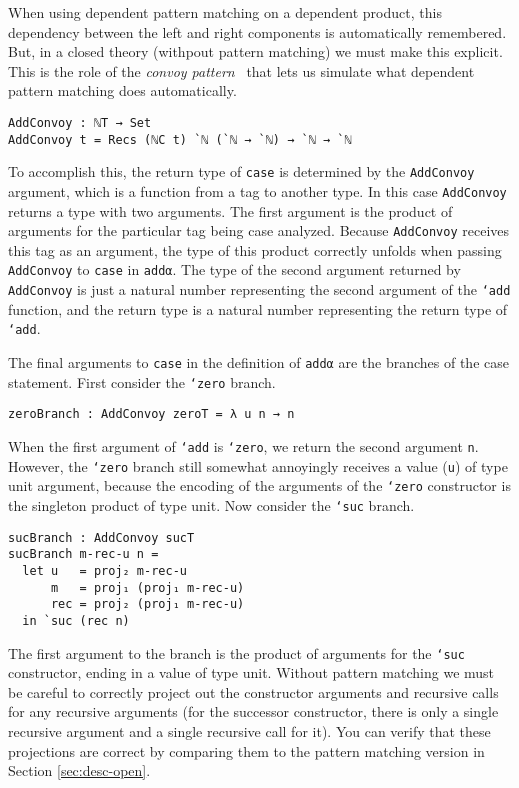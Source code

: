 \documentclass[runningheads,a4paper]{llncs}
\newcommand{\refsec}[1]{Section \ref{sec:#1}}
\begin{document}
When using dependent pattern
matching on a dependent product, this dependency between the left and
right components is automatically remembered. But, in a closed theory
(withpout pattern matching) we must make this explicit.  This is
the role of the {\it convoy pattern}~\cite{chlipala2011certified}
that lets us simulate what dependent pattern matching does automatically.



\begin{verbatim}
AddConvoy : ℕT → Set
AddConvoy t = Recs (ℕC t) `ℕ (`ℕ → `ℕ) → `ℕ → `ℕ
\end{verbatim}

To accomplish this, the return type of {\tt case} is determined by the
{\tt AddConvoy} argument, which is a function from a tag to another
type. In this case {\tt AddConvoy} returns a type with two arguments.
The first argument is the product of arguments for the particular tag
being case analyzed. Because {\tt AddConvoy} receives this tag as an
argument, the type of this product correctly unfolds when passing
{\tt AddConvoy} to {\tt case} in {\tt addα}. The type of the second
argument returned by {\tt AddConvoy} is just a natural number
representing the second argument of the {\tt `add} function, and the
return type is a natural number representing the return type of
{\tt `add}.

The final arguments to {\tt case} in the definition of
{\tt addα} are the branches of the case statement.
First consider the {\tt `zero} branch.

\begin{verbatim}
zeroBranch : AddConvoy zeroT = λ u n → n
\end{verbatim}

When the first argument of {\tt `add} is {\tt `zero}, we return the
second argument {\tt n}. However, the {\tt `zero} branch still
somewhat annoyingly receives a value ({\tt u}) of type unit
argument, because the encoding of the arguments of the {\tt `zero}
constructor is the singleton product of type unit.
Now consider the {\tt `suc} branch.

\begin{verbatim}
sucBranch : AddConvoy sucT
sucBranch m-rec-u n =
  let u   = proj₂ m-rec-u
      m   = proj₁ (proj₁ m-rec-u)
      rec = proj₂ (proj₁ m-rec-u)
  in `suc (rec n)
\end{verbatim}

The first argument to the branch is the product of arguments for the
{\tt `suc} constructor, ending in a value of type unit. Without
pattern matching we must be careful to correctly project out the
constructor arguments and recursive calls for any recursive arguments
(for the successor constructor, there is only a single recursive
argument and a single recursive call for it). You can verify that
these projections are correct by comparing them to the pattern
matching version in \refsec{desc-open}.
\end{document}
